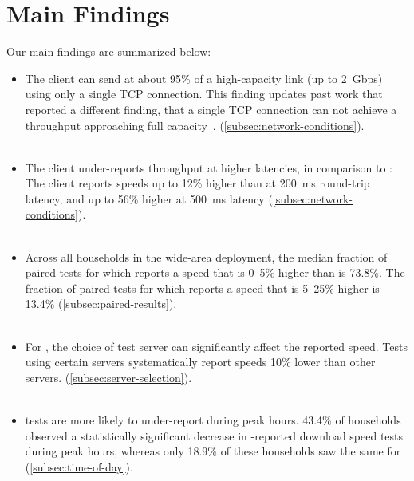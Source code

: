 \section{Main Findings} \label{sec:findings}

Our main findings are summarized below:
\begin{itemize}
    \item   The \ndt client can send at about 95\% of a high-capacity link (up to
			2~Gbps) using only a single TCP connection. This finding updates past work
			that reported a different finding, that a single TCP connection can not achieve a
			throughput approaching full capacity~\cite{feamster2020measuring}. 
			(\cref{subsec:network-conditions}).\\\\
			
	\item	The \ndt client under-reports throughput at higher latencies, in comparison
			to \ookla: The \ookla client reports speeds up to 12\% higher than \ndt at
			200~ms round-trip latency, and up to 56\% higher at 500~ms latency
			(\cref{subsec:network-conditions}).\\\\
			
    \item	Across all households in the wide-area deployment, the median fraction of paired tests 
			for which \ookla
			reports a speed that is 0--5\% higher than \ndt is 73.8\%. The fraction of
			paired tests for which \ookla reports a speed that is 5--25\% higher is
			13.4\% (\cref{subsec:paired-results}).\\\\
			
	\item 	For \ookla, the choice of test server can significantly affect the reported
			speed. Tests using certain \ookla servers systematically report speeds 10\%
			lower than other servers. (\cref{subsec:server-selection}). \\\\
			
	\item	\ndt tests are more likely to under-report during peak hours. 43.4\% of
			households observed a statistically significant decrease in \ndt-reported
			download speed tests during peak hours, whereas only 18.9\% of these
			households saw the same for \ookla (\cref{subsec:time-of-day}).\\ \hline
\end{itemize}


